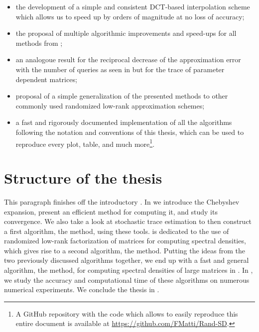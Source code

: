 \begin{itemize}
    \item the development of a simple and consistent \gls{DCT}-based interpolation
          scheme which allows us to speed up \cite[algorithm~5]{lin2017randomized}
          by orders of magnitude at no loss of accuracy;
    \item the proposal of multiple algorithmic improvements and speed-ups
          for all methods from \cite{lin2017randomized};
    \item an analogoue result for the reciprocal decrease of the approximation
          error with the number of queries as seen in \cite[theorem~1]{meyer2021hutch}
          but for the trace of parameter dependent matrices;
    \item proposal of a simple generalization of the presented methods to other
          commonly used randomized low-rank approximation schemes;
    \item a fast and rigorously documented implementation of all the algorithms
          following the notation and conventions of this thesis, which can be used to
          reproduce every plot, table, and much more\footnote{A GitHub repository
          with the code which allows to easily reproduce this entire document
          is available at \url{https://github.com/FMatti/Rand-SD}.}.
\end{itemize}


\section{Structure of the thesis}
\label{sec:1-introduction-structure}

This paragraph finishes off the introductory .
In  we introduce the Chebyshev expansion, present an
efficient method for computing it, and study its convergence. We also take a
look at stochastic trace estimation to then construct a first algorithm,
the  method, using these tools.
 is dedicated to the use of randomized low-rank factorization
of matrices for computing spectral densities, which gives rise to a second algorithm,
the  method.
Putting the ideas from the two previously discussed algorithms together,
we end up with a fast and general algorithm, the  method, for computing spectral densities
of large matrices in . In ,
we study the accuracy and computational time of these algorithms on numerous
numerical experiments. We conclude the thesis in .
